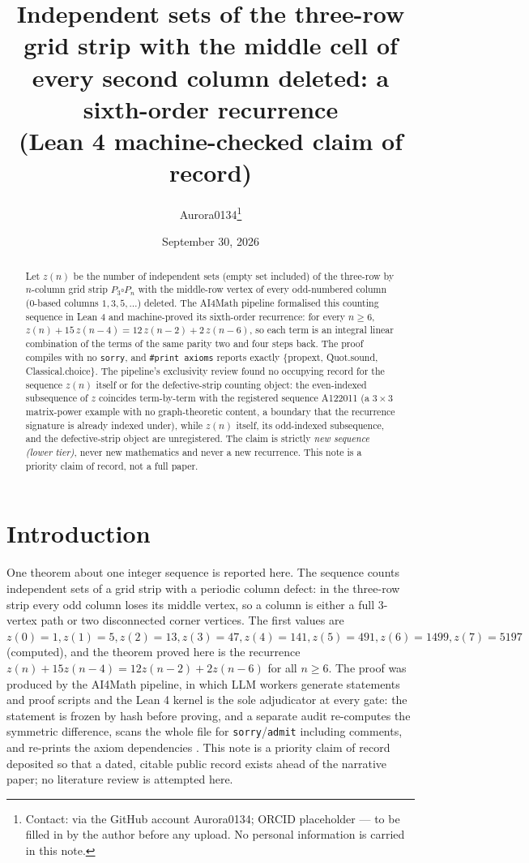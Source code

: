 \documentclass[11pt]{article}
\title{Independent sets of the three-row grid strip with the middle cell of
every second column deleted: a sixth-order recurrence\\ (Lean 4
machine-checked claim of record)}
\author{Aurora0134\thanks{Contact: via the GitHub account Aurora0134; ORCID
placeholder --- to be filled in by the author before any upload. No personal
information is carried in this note.}}
\date{September 30, 2026}
\begin{document}
\maketitle

\begin{abstract}
Let $z(n)$ be the number of independent sets (empty set included) of the
three-row by $n$-column grid strip $P_3\square P_n$ with the middle-row
vertex of every odd-numbered column (0-based columns $1,3,5,\dots$) deleted.
The AI4Math pipeline formalised this counting sequence in Lean 4 and
machine-proved its sixth-order recurrence: for every $n \ge 6$,
$z(n) + 15\,z(n-4) = 12\,z(n-2) + 2\,z(n-6)$, so each term is an integral
linear combination of the terms of the same parity two and four steps back.
The proof compiles with no \texttt{sorry}, and \texttt{\#print axioms}
reports exactly \{propext, Quot.sound, Classical.choice\}. The pipeline's
exclusivity review found no occupying record for the sequence $z(n)$ itself
or for the defective-strip counting object: the even-indexed subsequence of
$z$ coincides term-by-term with the registered sequence A122011 (a $3\times3$
matrix-power example with no graph-theoretic content, a boundary that the
recurrence signature is already indexed under), while $z(n)$ itself, its
odd-indexed subsequence, and the defective-strip object are unregistered.
The claim is strictly \emph{new sequence (lower tier)}, never new
mathematics and never a new recurrence. This note is a priority claim of
record, not a full paper.
\end{abstract}

\section{Introduction}

One theorem about one integer sequence is reported here. The sequence counts
independent sets of a grid strip with a periodic column defect: in the
three-row strip every odd column loses its middle vertex, so a column is
either a full $3$-vertex path or two disconnected corner vertices. The first
values are $z(0)=1, z(1)=5, z(2)=13, z(3)=47, z(4)=141, z(5)=491,
z(6)=1499, z(7)=5197$ (computed), and the theorem proved here is the
recurrence $z(n) + 15 z(n-4) = 12 z(n-2) + 2 z(n-6)$ for all $n \ge 6$. The
proof was produced by the AI4Math pipeline, in which LLM workers generate
statements and proof scripts and the Lean 4 kernel is the sole adjudicator
at every gate: the statement is frozen by hash before proving, and a separate
audit re-computes the symmetric difference, scans the whole file for
\texttt{sorry}/\texttt{admit} including comments, and re-prints the axiom
dependencies \cite{lean4}. This note is a priority claim of record deposited
so that a dated, citable public record exists ahead of the narrative paper;
no literature review is attempted here.
\end{document}
